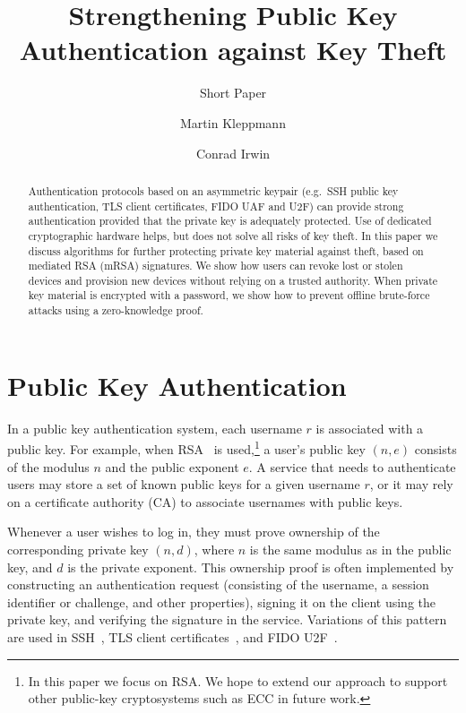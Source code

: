\documentclass{llncs}
\begin{document}
\title{Strengthening Public Key Authentication against Key Theft}
\subtitle{Short Paper}
\author{Martin Kleppmann \and Conrad Irwin}
\maketitle

\begin{abstract}
Authentication protocols based on an asymmetric keypair (e.g.\ SSH public key authentication, TLS
client certificates, FIDO UAF and U2F) can provide strong authentication provided that the private
key is adequately protected. Use of dedicated cryptographic hardware helps, but does not solve all
risks of key theft. In this paper we discuss algorithms for further protecting private key material
against theft, based on mediated RSA (mRSA) signatures. We show how users can revoke lost or stolen
devices and provision new devices without relying on a trusted authority. When private key material
is encrypted with a password, we show how to prevent offline brute-force attacks using a
zero-knowledge proof.
\end{abstract}

\section{Public Key Authentication}\label{sec:intro}

In a public key authentication system, each username $r$ is associated with a public key. For
example, when RSA~\cite{RSA} is used,\footnote{In this paper we focus on RSA. We hope to extend our
approach to support other public-key cryptosystems such as ECC in future work.} a user's public key
$(n, e)$ consists of the modulus $n$ and the public exponent $e$. A service that needs to
authenticate users may store a set of known public keys for a given username $r$, or it may rely on
a certificate authority (CA) to associate usernames with public keys.

Whenever a user wishes to log in, they must prove ownership of the corresponding private key
$(n, d)$, where $n$ is the same modulus as in the public key, and $d$ is the private exponent. This
ownership proof is often implemented by constructing an authentication request (consisting of the
username, a session identifier or challenge, and other properties), signing it on the client using
the private key, and verifying the signature in the service. Variations of this pattern are used in
SSH~\cite{SSH}, TLS client certificates~\cite{TLS}, and FIDO U2F~\cite{FIDOOverview}.
\end{document}
